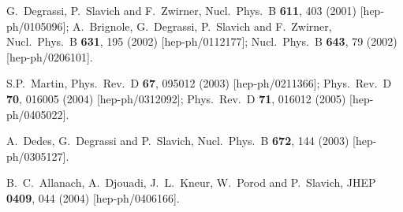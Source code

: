 \documentclass[12pt]{article}
\begin{document}
\begin{thebibliography}{999}
G.~Degrassi, P.~Slavich and F.~Zwirner,
  Nucl.\ Phys.\ B {\bf 611}, 403 (2001)
  [hep-ph/0105096];
A.~Brignole, G.~Degrassi, P.~Slavich and F.~Zwirner,
  Nucl.\ Phys.\ B {\bf 631}, 195 (2002)
  [hep-ph/0112177];
  Nucl.\ Phys.\ B {\bf 643}, 79 (2002)
  [hep-ph/0206101].
  
S.P.~Martin,
  Phys.\ Rev.\ D {\bf 67}, 095012 (2003)
  [hep-ph/0211366];
  Phys.\ Rev.\ D {\bf 70}, 016005 (2004)
  [hep-ph/0312092];
  Phys.\ Rev.\ D {\bf 71}, 016012 (2005)
  [hep-ph/0405022].

  A.~Dedes, G.~Degrassi and P.~Slavich,
  Nucl.\ Phys.\ B {\bf 672}, 144 (2003)
  [hep-ph/0305127].

  B.~C.~Allanach, A.~Djouadi, J.~L.~Kneur, W.~Porod and P.~Slavich,
  JHEP {\bf 0409}, 044 (2004)
  [hep-ph/0406166].
    

\end{thebibliography}
\end{document}
